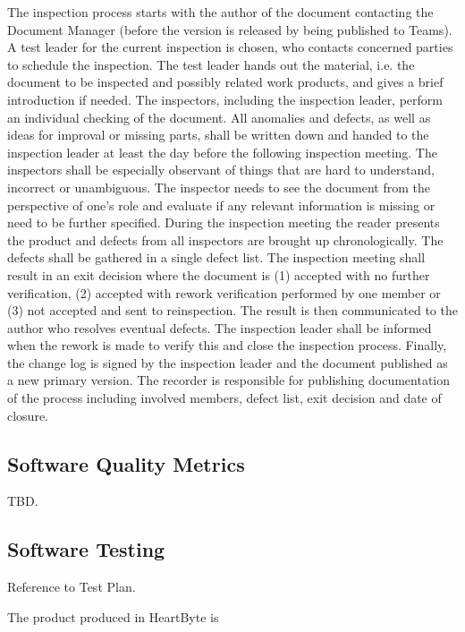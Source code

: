 \documentclass{article}
\begin{document}
	The inspection process starts with the author of the document contacting the Document Manager (before the version is released by being published to Teams). A test leader for the current inspection is chosen, who contacts concerned parties to schedule the inspection. The test leader hands out the material, i.e. the document to be inspected and possibly related work products, and gives a brief introduction if needed. The inspectors, including the inspection leader, perform an individual checking of the document. All anomalies and defects, as well as ideas for improval or missing parts, shall be written down and handed to the inspection leader at least the day before the following inspection meeting. The inspectors shall be especially observant of things that are hard to understand, incorrect or unambiguous. The inspector needs to see the document from the perspective of one's role and evaluate if any relevant information is missing or need to be further specified. During the inspection meeting the reader presents the product and defects from all inspectors are  brought up chronologically. The defects shall be gathered in a single defect list. The inspection meeting shall result in an exit decision where the document is (1) accepted with no further verification, (2) accepted with rework verification performed by one member or (3) not accepted and sent to reinspection. The result is then communicated to the author who resolves eventual defects. The inspection leader shall be informed when the rework is made to verify this and close the inspection process. Finally, the change log is signed by the inspection leader and the document published as a new primary version. The recorder is responsible for publishing documentation of the process including involved members, defect list, exit decision and date of closure.
	
	\subsection{Software Quality Metrics}
		
	TBD.
	
	\subsection{Software Testing}
	Reference to Test Plan. %
	
	The product produced in HeartByte is 
	
\end{document}
